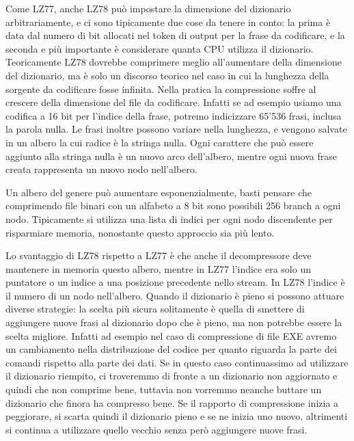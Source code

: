 Come LZ77, anche LZ78 può impostare la dimensione del dizionario arbitrariamente, e ci sono tipicamente due cose da tenere in conto: la prima è data dal numero di bit allocati nel token di output per la frase da codificare, e la seconda e più importante è considerare quanta CPU utilizza il dizionario. Teoricamente LZ78 dovrebbe comprimere meglio all'aumentare della dimensione del dizionario, ma è solo un discorso teorico nel caso in cui la lunghezza della sorgente da codificare fosse infinita. Nella pratica la compressione soffre al crescere della dimensione del file da codificare. Infatti se ad esempio usiamo una codifica a 16 bit per l'indice della frase, potremo indicizzare 65'536 frasi, inclusa la parola nulla. Le frasi inoltre possono variare nella lunghezza, e vengono salvate in un albero la cui radice è la stringa nulla. Ogni carattere che può essere aggiunto alla stringa nulla è un nuovo arco dell'albero, mentre ogni nuova frase creata rappresenta un nuovo nodo nell'albero.

\begin{figure}[htbp!]
  \centering
  
\end{figure}
\FloatBarrier

Un albero del genere può aumentare esponenzialmente, basti pensare che comprimendo file binari con un alfabeto a 8 bit sono possibili 256 branch a ogni nodo. Tipicamente si utilizza una lista di indici per ogni nodo discendente per risparmiare memoria, nonostante questo approccio sia più lento.

Lo svantaggio di LZ78 rispetto a LZ77 è che anche il decompressore deve mantenere in memoria questo albero, mentre in LZ77 l'indice era solo un puntatore o un indice a una posizione precedente nello stream. In LZ78 l'indice è il numero di un nodo nell'albero. Quando il dizionario è pieno si possono attuare diverse strategie: la scelta più sicura solitamente è quella di smettere di aggiungere nuove frasi al dizionario dopo che è pieno, ma non potrebbe essere la scelta migliore. Infatti ad esempio nel caso di compressione di file EXE avremo un cambiamento nella distribuzione del codice per quanto riguarda la parte dei comandi rispetto alla parte dei dati. Se in questo caso continuassimo ad utilizzare il dizionario riempito, ci troveremmo di fronte a un dizionario non aggiornato e quindi che non comprime bene, tuttavia non vorremmo neanche buttare un dizionario che finora ha compresso bene. Se il rapporto di compressione inizia a peggiorare, si scarta quindi il dizionario pieno e se ne inizia uno nuovo, altrimenti si continua a utilizzare quello vecchio senza però aggiungere nuove frasi.

